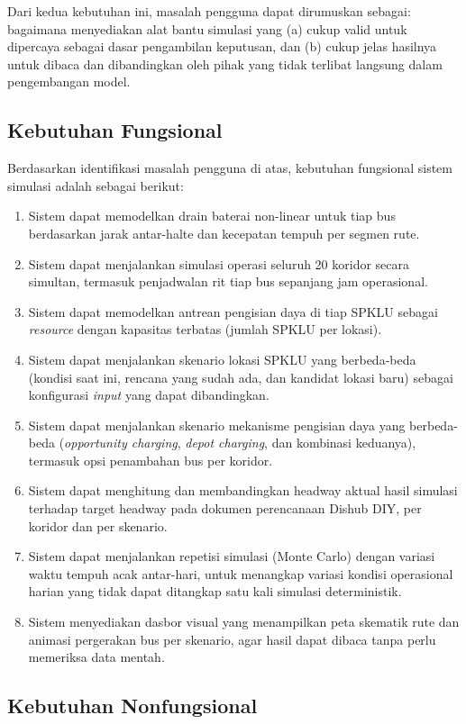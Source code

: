 Dari kedua kebutuhan ini, masalah pengguna dapat dirumuskan sebagai:
bagaimana menyediakan alat bantu simulasi yang (a) cukup valid untuk
dipercaya sebagai dasar pengambilan keputusan, dan (b) cukup jelas hasilnya
untuk dibaca dan dibandingkan oleh pihak yang tidak terlibat langsung dalam
pengembangan model.

\subsection{Kebutuhan Fungsional}

Berdasarkan identifikasi masalah pengguna di atas, kebutuhan fungsional
sistem simulasi adalah sebagai berikut:
\begin{enumerate}
	\item Sistem dapat memodelkan drain baterai non-linear untuk tiap bus
	berdasarkan jarak antar-halte dan kecepatan tempuh per segmen rute.
	\item Sistem dapat menjalankan simulasi operasi seluruh 20 koridor secara
	simultan, termasuk penjadwalan rit tiap bus sepanjang jam operasional.
	\item Sistem dapat memodelkan antrean pengisian daya di tiap SPKLU sebagai
	\textit{resource} dengan kapasitas terbatas (jumlah SPKLU per lokasi).
	\item Sistem dapat menjalankan skenario lokasi SPKLU yang berbeda-beda
	(kondisi saat ini, rencana yang sudah ada, dan kandidat lokasi baru)
	sebagai konfigurasi \textit{input} yang dapat dibandingkan.
	\item Sistem dapat menjalankan skenario mekanisme pengisian daya yang
	berbeda-beda (\textit{opportunity charging}, \textit{depot charging}, dan
	kombinasi keduanya), termasuk opsi penambahan bus per koridor.
	\item Sistem dapat menghitung dan membandingkan headway aktual hasil
	simulasi terhadap target headway pada dokumen perencanaan Dishub DIY,
	per koridor dan per skenario.
	\item Sistem dapat menjalankan repetisi simulasi (Monte Carlo) dengan
	variasi waktu tempuh acak antar-hari, untuk menangkap variasi kondisi
	operasional harian yang tidak dapat ditangkap satu kali simulasi
	deterministik.
	\item Sistem menyediakan dasbor visual yang menampilkan peta skematik rute
	dan animasi pergerakan bus per skenario, agar hasil dapat dibaca tanpa
	perlu memeriksa data mentah.
\end{enumerate}

\subsection{Kebutuhan Nonfungsional}

